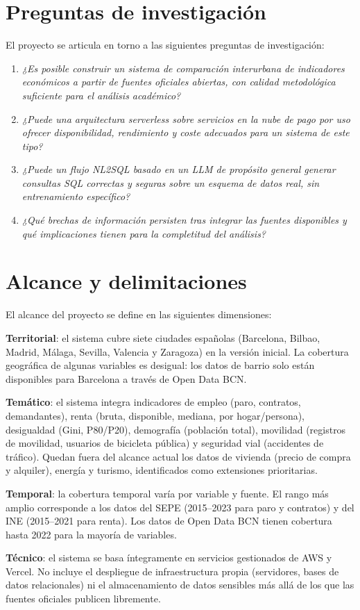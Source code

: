 \section{Preguntas de investigación}

El proyecto se articula en torno a las siguientes preguntas de investigación:

\begin{enumerate}
  \item \textit{¿Es posible construir un sistema de comparación interurbana de indicadores económicos a partir de fuentes oficiales abiertas, con calidad metodológica suficiente para el análisis académico?}

  \item \textit{¿Puede una arquitectura \textit{serverless} sobre servicios en la nube de pago por uso ofrecer disponibilidad, rendimiento y coste adecuados para un sistema de este tipo?}

  \item \textit{¿Puede un flujo NL2SQL basado en un LLM de propósito general generar consultas SQL correctas y seguras sobre un esquema de datos real, sin entrenamiento específico?}

  \item \textit{¿Qué brechas de información persisten tras integrar las fuentes disponibles y qué implicaciones tienen para la completitud del análisis?}
\end{enumerate}

\section{Alcance y delimitaciones}

El alcance del proyecto se define en las siguientes dimensiones:

\textbf{Territorial}: el sistema cubre siete ciudades españolas (Barcelona, Bilbao, Madrid, Málaga, Sevilla, Valencia y Zaragoza) en la versión inicial. La cobertura geográfica de algunas variables es desigual: los datos de barrio solo están disponibles para Barcelona a través de Open Data BCN.

\textbf{Temático}: el sistema integra indicadores de empleo (paro, contratos, demandantes), renta (bruta, disponible, mediana, por hogar/persona), desigualdad (Gini, P80/P20), demografía (población total), movilidad (registros de movilidad, usuarios de bicicleta pública) y seguridad vial (accidentes de tráfico). Quedan fuera del alcance actual los datos de vivienda (precio de compra y alquiler), energía y turismo, identificados como extensiones prioritarias.

\textbf{Temporal}: la cobertura temporal varía por variable y fuente. El rango más amplio corresponde a los datos del SEPE (2015--2023 para paro y contratos) y del INE (2015--2021 para renta). Los datos de Open Data BCN tienen cobertura hasta 2022 para la mayoría de variables.

\textbf{Técnico}: el sistema se basa íntegramente en servicios gestionados de AWS y Vercel. No incluye el despliegue de infraestructura propia (servidores, bases de datos relacionales) ni el almacenamiento de datos sensibles más allá de los que las fuentes oficiales publicen libremente.
